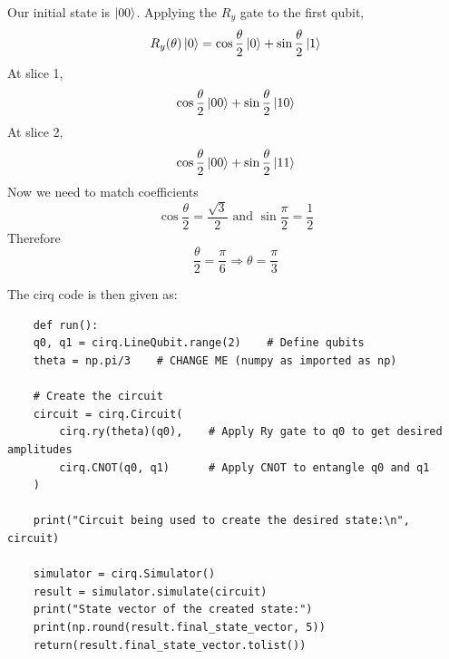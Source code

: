 Our initial state is $\ket{00}$. Applying the $R_y$ gate to the first qubit,
\begin{equation}
    R_y(\theta)\ket{0} = \cos \frac{\theta}{2}\ket{0} + \sin \frac{\theta}{2}\ket{1}
\end{equation}
At slice 1,
\begin{equation}
    \cos \frac{\theta}{2}\ket{00} + \sin \frac{\theta}{2}\ket{10}
\end{equation}
At slice 2,
\begin{equation}
    \cos \frac{\theta}{2}\ket{00} + \sin \frac{\theta}{2}\ket{11}
\end{equation}
Now we need to match coefficients
\begin{equation}
    \cos \frac{\theta}{2} = \frac{\sqrt{3}}{2} \text{ and } \sin \frac{\pi}{2} = \frac{1}{2}
\end{equation}
Therefore
\begin{equation}
    \frac{\theta}{2} = \frac{\pi}{6} \Rightarrow \boxed{\theta =\frac{\pi}{3}}
\end{equation}

The cirq code is then given as: 
\begin{lstlisting}
    def run():
    q0, q1 = cirq.LineQubit.range(2)    # Define qubits
    theta = np.pi/3    # CHANGE ME (numpy as imported as np)
    
    # Create the circuit
    circuit = cirq.Circuit(
        cirq.ry(theta)(q0),    # Apply Ry gate to q0 to get desired amplitudes
        cirq.CNOT(q0, q1)      # Apply CNOT to entangle q0 and q1
    )
    
    print("Circuit being used to create the desired state:\n", circuit)

    simulator = cirq.Simulator()
    result = simulator.simulate(circuit)
    print("State vector of the created state:")
    print(np.round(result.final_state_vector, 5))
    return(result.final_state_vector.tolist())

\end{lstlisting}

\newpage
